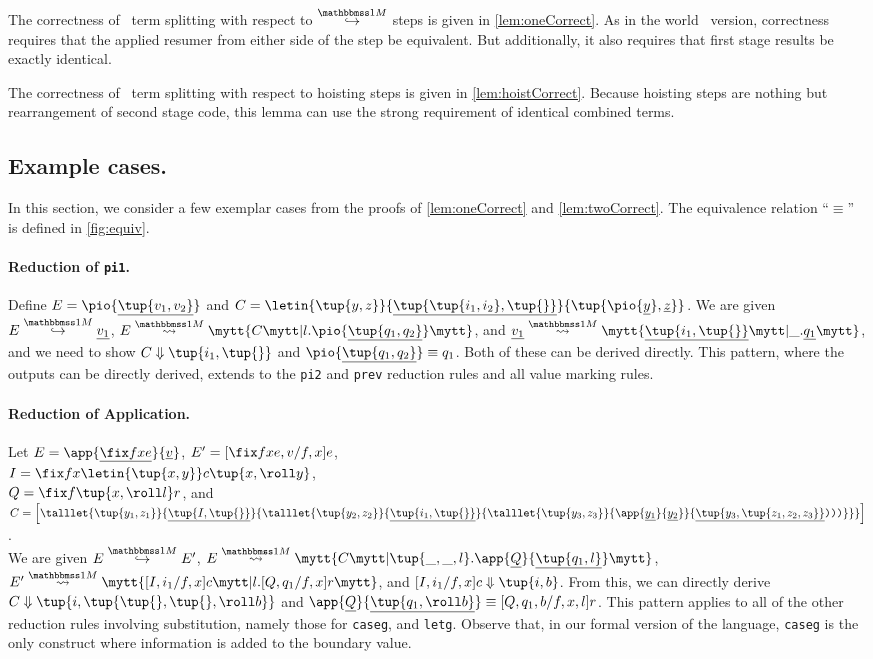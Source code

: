 \begin{abstrsyn}
The correctness of \bbonem\ term splitting with respect to $\stepsym \bbonem$ steps is given in \ref{lem:oneCorrect}.
As in the world \bbtwo\ version, correctness requires that the applied resumer from either side of the step be equivalent.
But additionally, it also requires that first stage results be exactly identical.

The correctness of \bbonem\ term splitting with respect to hoisting steps is given in \ref{lem:hoistCorrect}.
Because hoisting steps are nothing but rearrangement of second stage code,
this lemma can use the strong requirement of identical combined terms.

\subsection{Example cases.}

In this section, we consider a few exemplar cases 
from the proofs of \ref{lem:oneCorrect} and \ref{lem:twoCorrect}.
The equivalence relation ``$\equiv$'' is defined in \ref{fig:equiv}.

\paragraph{Reduction of {\tt pi1}.}
Define $E = \pio {\exv{\tup {v_1,v_2}}}$ and  
$C = \letin{\tup{y,z}}{\exv{\tup{\tup {i_1,i_2},\tup{}}}}{\tup{\pio {\exv y},\exv z}}$.
We are given $\stepmix  E {\exv {v_1}}$,
$\splitone E A C {l.\pio {\exv {\tup{q_1,q_2}}}}$, and
$\splitone {\exv {v_1}} A {\exv {\tup{i_1,\tup{}}}} {\_.\exv{q_1}}$,
and we need to show $\reduce C {\tup {i_1,\tup{}}}$
and $\pio {\exv {\tup{q_1,q_2}}} \equiv q_1$.
Both of these can be derived directly.
This pattern, where the outputs can be directly derived, extends to the {\tt pi2} and {\tt prev} reduction rules and all value marking rules.

\paragraph{Reduction of Application.} Let $E = \app {\exv{\fix f x e}} {\exv v}$,
$E' = [\fix fxe, v/f,x] e$, \\ 
$I = \fix f x {\letin {\tup{x,y}} c {\tup{x,\roll y}}}$, \\
$Q = \fix f {\tup{x,\roll l}} r$, and \\
$C = \left[
\talllet{\tup{y_1,z_1}}{\exv {\tup {I,\tup{}}}}{
\talllet{\tup{y_2,z_2}} {\exv {\tup {i_1,\tup{}}}}{
\talllet{\tup{y_3,z_3}}{\app{\exv {y_1}}{\exv {y_2}}}{\exv{\tup{y_3,\tup{z_1,z_2,z_3}}}\ttrpar\ttrpar\ttrpar}}}\right]$.
\\
We are given $\stepmix E {E'}$,
$\splitone E A C {\tup{\_,\_,l}.\app{\exv Q}{\exv{\tup{q_1,l}}}}$,
$\splitone {E'} A {[I,i_1/f,x]c} {l.[Q,q_1/f,x]r}$,
and $\reduce {[I,i_1/f,x]c} {\tup{i,b}}$.
From this, we can directly derive $\reduce C {\tup{i,\tup {\tup{},\tup{},\roll b}}}$
and $\app{\exv Q}{\exv{\tup{q_1,\roll b}}} \equiv [Q,q_1,b/f,x,l] r$.
This pattern applies to all of the other reduction rules involving substitution,
namely those for {\tt caseg}, and {\tt letg}. 
Observe that, in our formal version of the language, 
{\tt caseg} is the only construct where information is added to the boundary value.


\end{abstrsyn}
